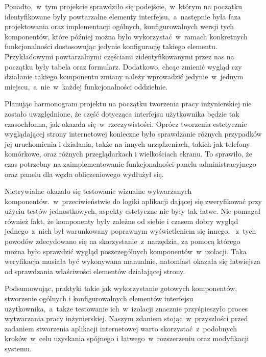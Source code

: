 \documentclass[a4paper,11pt,twoside]{report}
\theoremstyle{definition}
\begin{document}
            Ponadto,~w~tym projekcie sprawdziło się podejście,~w~którym na początku identyfikowane były powtarzalne elementy interfejsu,~a~następnie była faza projektowania oraz implementacji ogólnych, konfigurowalnych wersji tych komponentów, które później można było wykorzystać~w~ramach konkretnych funkcjonalności dostosowując jedynie konfigurację takiego elementu.
            Przykładowymi powtarzalnymi częściami zidentyfikowanymi przez nas na początku były tabela oraz formularz. Dodatkowo, chcąc zmienić wygląd czy działanie takiego komponentu zmiany należy wprowadzić jedynie~w~jednym miejscu,~a~nie~w~każdej funkcjonalności oddzielnie.
        
            Planując harmonogram projektu na początku tworzenia pracy inżynierskiej nie zostało uwzględnione, że część dotycząca interfejsu użytkownika będzie tak czasochłonna, jak okazała się~w~rzeczywistości.
            Oprócz tworzenia estetycznie wyglądającej strony internetowej konieczne było sprawdzanie różnych przypadków jej uruchomienia i działania, także na innych urządzeniach, takich jak telefony komórkowe, oraz różnych przeglądarkach i wielkościach ekranu. To sprawiło, że czas potrzebny na zaimplementowanie funkcjonalności panelu administracyjnego oraz panelu dla węzła obliczeniowego wydłużył się.
            
            Nietrywialne okazało się testowanie wizualne wytwarzanych komponentów.~w~przeciwieństwie do logiki aplikacji dającej się zweryfikować przy użyciu testów jednostkowych, aspekty estetyczne nie były tak łatwe. Nie pomagał również fakt, że komponenty były zależne od siebie i czasem dobry wygląd jednego~z~nich był warunkowany poprawnym wyświetleniem się innego.
           ~z~tych powodów zdecydowano się na skorzystanie~z~narzędzia, za pomocą którego można było sprawdzić wygląd poszczególnych komponentów~w~izolacji. Taka weryfikacja musiała być wykonywana manualnie, natomiast okazała się łatwiejsza od sprawdzania właściwości elementów działającej strony.
            
            Podsumowując, praktyki takie jak wykorzystanie gotowych komponentów, stworzenie ogólnych i konfigurowalnych elementów interfejsu użytkownika,~a~także testowanie ich~w~izolacji znacznie przyśpieszyło proces wytwarzania pracy inżynierskiej.
            Naszym zdaniem stojąc~w~przyszłości przed zadaniem stworzenia aplikacji internetowej warto skorzystać~z~podobnych kroków~w~celu uzyskania spójnego i łatwego~w~rozszerzeniu oraz modyfikacji systemu.
        
\end{document}
